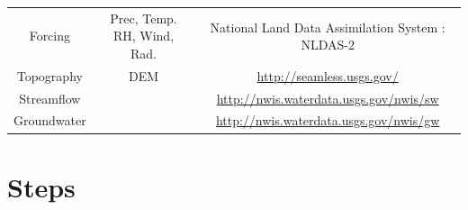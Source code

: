 \documentclass[]{scrbook}
\begin{document}
\begin{longtable}[]{@{}ccc@{}}
\begin{minipage}[t]{0.18\columnwidth}
Forcing\strut
\end{minipage} & \begin{minipage}[t]{0.24\columnwidth}\centering\strut
Prec, Temp. RH, Wind, Rad.\strut
\end{minipage} & \begin{minipage}[t]{0.43\columnwidth}\centering\strut
National Land Data Assimilation System : NLDAS-2\strut
\end{minipage}\tabularnewline
\begin{minipage}[t]{0.18\columnwidth}\centering\strut
Topography\strut
\end{minipage} & \begin{minipage}[t]{0.24\columnwidth}\centering\strut
DEM\strut
\end{minipage} & \begin{minipage}[t]{0.43\columnwidth}\centering\strut
\url{http://seamless.usgs.gov/}\strut
\end{minipage}\tabularnewline
\begin{minipage}[t]{0.18\columnwidth}\centering\strut
Streamflow\strut
\end{minipage} & \begin{minipage}[t]{0.24\columnwidth}\centering\strut
\strut
\end{minipage} & \begin{minipage}[t]{0.43\columnwidth}\centering\strut
\url{http://nwis.waterdata.usgs.gov/nwis/sw}\strut
\end{minipage}\tabularnewline
\begin{minipage}[t]{0.18\columnwidth}\centering\strut
Groundwater\strut
\end{minipage} & \begin{minipage}[t]{0.24\columnwidth}\centering\strut
\strut
\end{minipage} & \begin{minipage}[t]{0.43\columnwidth}\centering\strut
\url{http://nwis.waterdata.usgs.gov/nwis/gw}\strut
\end{minipage}\tabularnewline
\bottomrule
\end{longtable}

\section{Steps}\label{steps}
\end{document}
